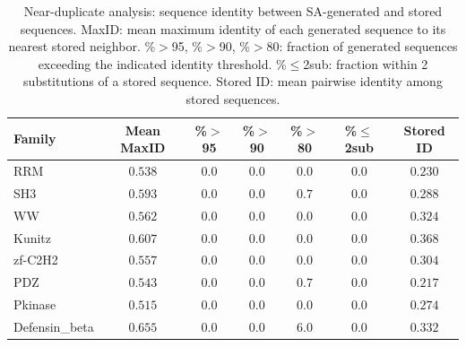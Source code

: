 \begin{table}[ht]
\centering
\caption{Near-duplicate analysis: sequence identity between SA-generated and stored sequences. MaxID: mean maximum identity of each generated sequence to its nearest stored neighbor. \%$>$95, \%$>$90, \%$>$80: fraction of generated sequences exceeding the indicated identity threshold. \%$\leq$2sub: fraction within 2 substitutions of a stored sequence. Stored ID: mean pairwise identity among stored sequences.}
\label{tab:identity-dist}
\small
\begin{tabular}{@{}lcccccc@{}}
\toprule
Family & Mean MaxID & \%$>$95 & \%$>$90 & \%$>$80 & \%$\leq$2sub & Stored ID \\
\midrule
RRM            & $0.538$ & $0.0$ & $0.0$ & $0.0$ & $0.0$ & $0.230$ \\
SH3            & $0.593$ & $0.0$ & $0.0$ & $0.7$ & $0.0$ & $0.288$ \\
WW             & $0.562$ & $0.0$ & $0.0$ & $0.0$ & $0.0$ & $0.324$ \\
Kunitz         & $0.607$ & $0.0$ & $0.0$ & $0.0$ & $0.0$ & $0.368$ \\
zf-C2H2        & $0.557$ & $0.0$ & $0.0$ & $0.0$ & $0.0$ & $0.304$ \\
PDZ            & $0.543$ & $0.0$ & $0.0$ & $0.7$ & $0.0$ & $0.217$ \\
Pkinase        & $0.515$ & $0.0$ & $0.0$ & $0.0$ & $0.0$ & $0.274$ \\
Defensin\_beta & $0.655$ & $0.0$ & $0.0$ & $6.0$ & $0.0$ & $0.332$ \\
\bottomrule
\end{tabular}
\end{table}

